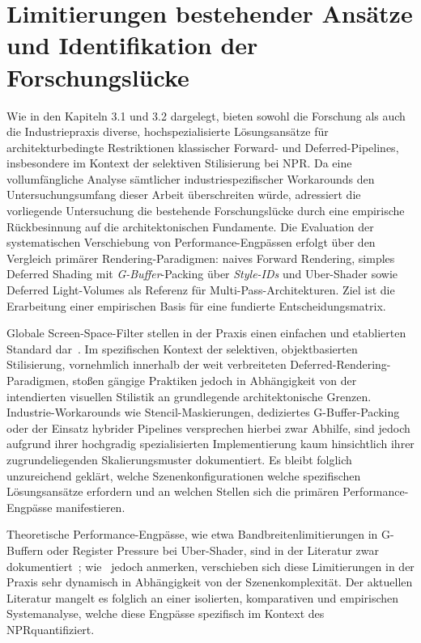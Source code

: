 \section{Limitierungen bestehender Ansätze und Identifikation der Forschungslücke}
\label{sec:0303_usp}

Wie in den Kapiteln 3.1 und 3.2 dargelegt, bieten sowohl die Forschung als auch die Industriepraxis diverse,
hochspezialisierte Lösungsansätze für architekturbedingte Restriktionen klassischer Forward- und Deferred-Pipelines,
insbesondere im Kontext der selektiven Stilisierung bei \ac{NPR}.
Da eine vollumfängliche Analyse sämtlicher industriespezifischer Workarounds den Untersuchungsumfang dieser Arbeit
überschreiten würde, adressiert die vorliegende Untersuchung die bestehende Forschungslücke durch eine empirische
Rückbesinnung auf die architektonischen Fundamente.
Die Evaluation der systematischen Verschiebung von Performance-Engpässen erfolgt über den Vergleich primärer
Rendering-Paradigmen: naives Forward Rendering, simples Deferred Shading mit \textit{G-Buffer}-Packing über
\textit{Style-IDs} und Uber-Shader sowie Deferred Light-Volumes als Referenz für Multi-Pass-Architekturen.
Ziel ist die Erarbeitung einer empirischen Basis für eine fundierte Entscheidungsmatrix.

Globale Screen-Space-Filter stellen in der Praxis einen einfachen und etablierten Standard
dar~\cite[S.~147]{magdicsPostprocessingNPREffects2013}.
Im spezifischen Kontext der selektiven, objektbasierten Stilisierung, vornehmlich innerhalb der weit verbreiteten
Deferred-Rendering-Paradigmen, stoßen gängige Praktiken jedoch in Abhängigkeit von der intendierten visuellen Stilistik
an grundlegende architektonische Grenzen.
Industrie-Workarounds wie Stencil-Maskierungen, dediziertes \ac{G-Buffer}-Packing oder der Einsatz hybrider Pipelines
versprechen hierbei zwar Abhilfe, sind jedoch aufgrund ihrer hochgradig spezialisierten Implementierung kaum
hinsichtlich ihrer zugrundeliegenden Skalierungsmuster dokumentiert.
Es bleibt folglich unzureichend geklärt, welche Szenenkonfigurationen welche spezifischen Lösungsansätze erfordern und
an welchen Stellen sich die primären Performance-Engpässe manifestieren.

Theoretische Performance-Engpässe, wie etwa Bandbreitenlimitierungen in \acs{G-Buffer}n oder Register Pressure bei
Uber-Shader, sind in der Literatur zwar
dokumentiert~\cite[Abschn.~6]{schiedDeferredAttributeInterpolation2015, akenine-mollerRealtimeRendering2019};
wie~\textcite[S.~905]{akenine-mollerRealtimeRendering2019} jedoch anmerken, verschieben sich diese Limitierungen in
der Praxis sehr dynamisch in Abhängigkeit von der Szenenkomplexität.
Der aktuellen Literatur mangelt es folglich an einer isolierten, komparativen und empirischen Systemanalyse, welche
diese Engpässe spezifisch im Kontext des \ac{NPR}quantifiziert.

